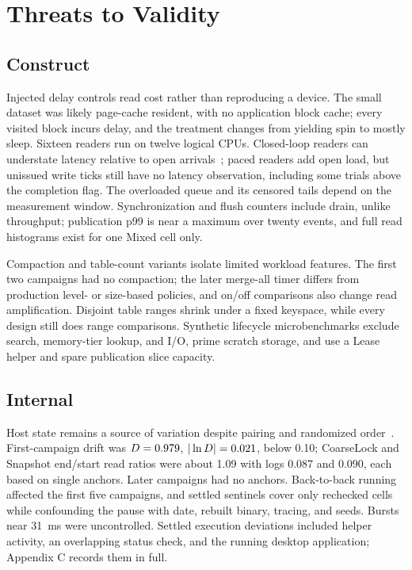 \documentclass[conference]{IEEEtran}
\begin{document}
\section{Threats to Validity}
\subsection{Construct}
Injected delay controls read cost rather than reproducing a device. The small dataset was likely page-cache resident, with no application block cache; every visited block incurs delay, and the treatment changes from yielding spin to mostly sleep. Sixteen readers run on twelve logical CPUs. Closed-loop readers can understate latency relative to open arrivals~\cite{schroeder2006}; paced readers add open load, but unissued write ticks still have no latency observation, including some trials above the completion flag. The overloaded queue and its censored tails depend on the measurement window. Synchronization and flush counters include drain, unlike throughput; publication p99 is near a maximum over twenty events, and full read histograms exist for one Mixed cell only.

Compaction and table-count variants isolate limited workload features. The first two campaigns had no compaction; the later merge-all timer differs from production level- or size-based policies, and on/off comparisons also change read amplification. Disjoint table ranges shrink under a fixed keyspace, while every design still does range comparisons. Synthetic lifecycle microbenchmarks exclude search, memory-tier lookup, and I/O, prime scratch storage, and use a Lease helper and spare publication slice capacity.

\subsection{Internal}
\label{sec:internal}
Host state remains a source of variation despite pairing and randomized order~\cite{mytkowicz2009}. First-campaign drift was $D=0.979$, $|\ln D|=0.021$, below 0.10; CoarseLock and Snapshot end/start read ratios were about 1.09 with logs 0.087 and 0.090, each based on single anchors. Later campaigns had no anchors. Back-to-back running affected the first five campaigns, and settled sentinels cover only rechecked cells while confounding the pause with date, rebuilt binary, tracing, and seeds. Bursts near 31~ms were uncontrolled. Settled execution deviations included helper activity, an overlapping status check, and the running desktop application; Appendix C records them in full.
\end{document}
